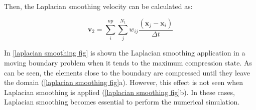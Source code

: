 \medskip
\noindent
Then, the Laplacian smoothing velocity can be calculated as:


\begin{equation}
\textbf{v}_{2}
= \sum_{i}^{np} \sum_{j}^{N_1} w_{ij}
\frac{\left( \textbf{x}_{j} - \textbf{x}_{i} \right)}{\Delta t}
\end{equation}

\medskip
In \ref{laplacian smoothing fig} is shown 
the Laplacian smoothing application in a moving boundary problem
when it tends to the maximum compression state.
As can be seen, the elements close to the boundary are compressed 
until they leave the domain (\ref{laplacian smoothing fig}a). 
However, this effect is not seen when 
Laplacian smoothing is applied (\ref{laplacian smoothing fig}b). 
In these cases, Laplacian smoothing becomes essential 
to perform the numerical simulation.


